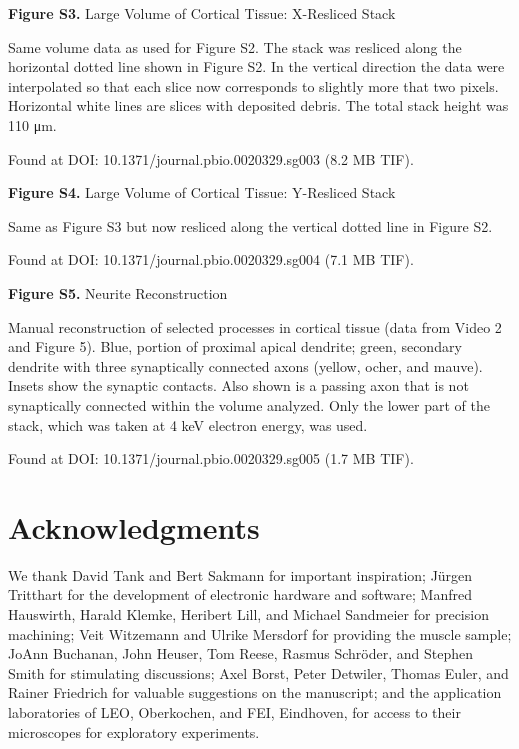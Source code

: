 \documentclass{article}
\begin{document}
\noindent \textbf{Figure S3.} Large Volume of Cortical Tissue: X-Resliced Stack\par
\noindent Same volume data as used for Figure S2. The stack was resliced along the horizontal dotted line shown in Figure S2. In the vertical direction the data were interpolated so that each slice now corresponds to slightly more that two pixels. Horizontal white lines are slices with deposited debris. The total stack height was 110 μm.\par
\noindent Found at DOI: 10.1371/journal.pbio.0020329.sg003 (8.2 MB TIF).

\noindent \textbf{Figure S4.} Large Volume of Cortical Tissue: Y-Resliced Stack\par
\noindent Same as Figure S3 but now resliced along the vertical dotted line in Figure S2.\par
\noindent Found at DOI: 10.1371/journal.pbio.0020329.sg004 (7.1 MB TIF).

\noindent \textbf{Figure S5.} Neurite Reconstruction\par
\noindent Manual reconstruction of selected processes in cortical tissue (data from Video 2 and Figure 5). Blue, portion of proximal apical dendrite; green, secondary dendrite with three synaptically connected axons (yellow, ocher, and mauve). Insets show the synaptic contacts. Also shown is a passing axon that is not synaptically connected within the volume analyzed. Only the lower part of the stack, which was taken at 4 keV electron energy, was used.\par
\noindent Found at DOI: 10.1371/journal.pbio.0020329.sg005 (1.7 MB TIF).


\section*{Acknowledgments}

We thank David Tank and Bert Sakmann for important inspiration; Jürgen Tritthart for the development of electronic hardware and software; Manfred Hauswirth, Harald Klemke, Heribert Lill, and Michael Sandmeier for precision machining; Veit Witzemann and Ulrike Mersdorf for providing the muscle sample; JoAnn Buchanan, John Heuser, Tom Reese, Rasmus Schröder, and Stephen Smith for stimulating discussions; Axel Borst, Peter Detwiler, Thomas Euler, and Rainer Friedrich for valuable suggestions on the manuscript; and the application laboratories of LEO, Oberkochen, and FEI, Eindhoven, for access to their microscopes for exploratory experiments.
\end{document}

